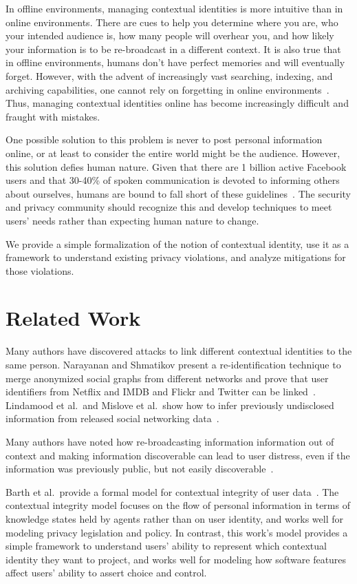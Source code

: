 \documentclass[10pt, conference, compsocconf]{IEEEtran}
\begin{document}
In offline environments, managing contextual identities is more intuitive than
in online environments. There are cues to help you determine where you are,
who your intended audience is, how many people will overhear you, and how
likely your information is to be re-broadcast in a different context. It is
also true that in offline environments, humans don't have perfect memories and
will eventually forget.  However, with the advent of increasingly vast
searching, indexing, and archiving capabilities, one cannot rely on forgetting
in online environments~\cite{delete}. Thus, managing contextual identities
online has become increasingly difficult and fraught with mistakes.

One possible solution to this problem is never to post personal information
online, or at least to consider the entire world might be the audience.
However, this solution defies human nature. Given that there are 1 billion
active Facebook users and that 30-40\% of spoken communication is devoted to
informing others about ourselves, humans are bound to fall short of these
guidelines~\cite{tamir,fbusers}. The security and privacy community should
recognize this and develop techniques to meet users' needs rather than
expecting human nature to change.

We provide a simple formalization of the notion of contextual identity, use it
as a framework to understand existing privacy violations, and analyze
mitigations for those violations.

\section{Related Work}

Many authors have discovered attacks to link different contextual identities to
the same person. Narayanan and Shmatikov present a re-identification technique
to merge anonymized social graphs from different networks and prove that
user identifiers from Netflix and IMDB and Flickr and Twitter can be
linked~\cite{narayanan1,narayanan2}. Lindamood et al.~and Mislove et al.~show
how to infer previously undisclosed information from released social networking
data~\cite{lindamood,mislove}.

Many authors have noted how re-broadcasting information information out of
context and making information discoverable can lead to user distress, even if
the information was previously public, but not easily
discoverable~\cite{boyd1,chew,nissenbaum}.

Barth et al.~provide a formal model for contextual integrity of user
data~\cite{barth}. The contextual integrity model focuses on the flow of
personal information in terms of knowledge states held by agents rather than on
user identity, and works well for modeling privacy legislation and policy. In
contrast, this work's model provides a simple framework to understand users'
ability to represent which contextual identity they want to project, and works
well for modeling how software features affect users' ability to assert choice
and control.
\end{document}
